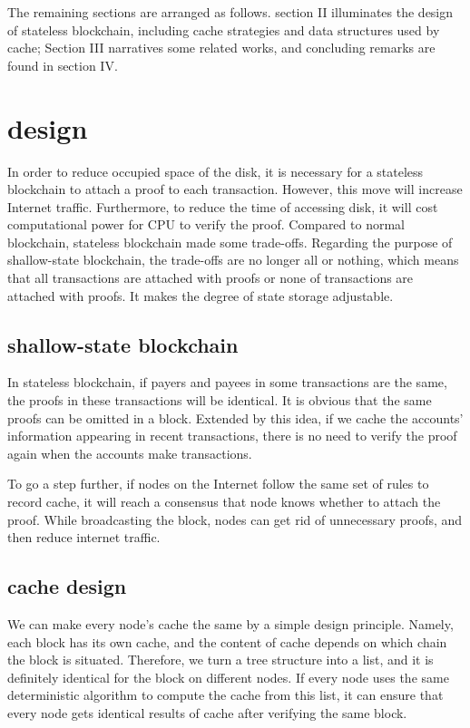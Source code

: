\documentclass[conference]{IEEEtran}
\begin{document}
The remaining sections are arranged as follows.
section II illuminates the design of stateless blockchain,
including cache strategies and data structures
used by cache; Section III narratives some related works,
and concluding remarks are found in section IV.

\section{design}
In order to reduce occupied space of the disk, it is necessary for a stateless blockchain to attach a proof to each transaction. However, this move will increase Internet traffic. Furthermore, to reduce the time of accessing disk, it will cost computational power for CPU to verify the proof.
Compared to normal blockchain, stateless blockchain made some trade-offs. Regarding the purpose of shallow-state blockchain, the trade-offs are no longer all or nothing, which means that all transactions are attached with proofs or none of transactions are attached with proofs. It makes the degree of state storage adjustable.

\subsection{shallow-state blockchain}
In stateless blockchain, if payers and payees in some transactions are the same, the proofs in these transactions will be identical. It is obvious that the same proofs can be omitted in a block. Extended by this idea, if we cache the accounts’ information appearing in recent transactions, there is no need to verify the proof again when the accounts make transactions.

To go a step further, if nodes on the Internet follow the same set of rules to record cache, it will reach a consensus that node knows whether to attach the proof. While broadcasting the block, nodes can get rid of unnecessary proofs, and then reduce internet traffic.

\subsection{cache design}
We can make every node's cache the same by a simple design principle. Namely, each block has its own cache, and the content of cache depends on which chain the block is situated. Therefore, we turn a tree structure into a list, and it is definitely identical for the block on different nodes. If every node uses the same deterministic algorithm to compute the cache from this list, it can ensure that every node gets identical results of cache after verifying the same block.
\end{document}
